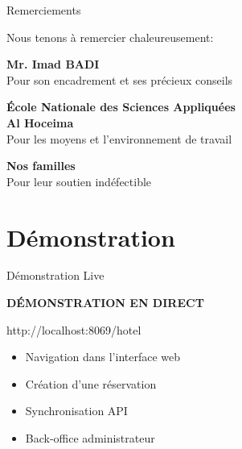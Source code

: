 \documentclass[aspectratio=169]{beamer}
\begin{document}
\begin{frame}{Remerciements}
    \begin{center}
        \Large
        Nous tenons à remercier chaleureusement:
        
        \vspace{20pt}
        
        \textbf{\textcolor{goldcolor}{Mr. Imad BADI}}\\
        \normalsize
        Pour son encadrement et ses précieux conseils
        
        \vspace{20pt}
        
        \textbf{École Nationale des Sciences Appliquées}\\
        \textbf{Al Hoceima}\\
        \normalsize
        Pour les moyens et l'environnement de travail
        
        \vspace{20pt}
        
        \textbf{Nos familles}\\
        \normalsize
        Pour leur soutien indéfectible
    \end{center}
\end{frame}

\section{Démonstration}

\begin{frame}{Démonstration Live}
    \begin{center}
        \Huge
        \textcolor{goldcolor}{}
        
        \vspace{20pt}
        
        \Large
        \textbf{DÉMONSTRATION EN DIRECT}
        
        \vspace{10pt}
        
        \normalsize
        http://localhost:8069/hotel
        
        \vspace{20pt}
        
        \large
        \begin{itemize}
            \item Navigation dans l'interface web
            \item Création d'une réservation
            \item Synchronisation API
            \item Back-office administrateur
        \end{itemize}
    \end{center}
\end{frame}
\end{document}

